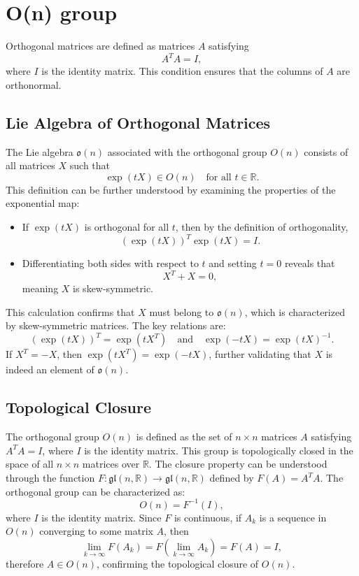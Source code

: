 \documentclass{article}
\begin{document}
\section{O(n) group}

Orthogonal matrices are defined as matrices \( A \) satisfying
\[
A^TA = I,
\]
where \( I \) is the identity matrix. This condition ensures that the columns of \( A \) are orthonormal.

\subsection*{Lie Algebra of Orthogonal Matrices}
The Lie algebra \( \mathfrak{o}(n) \) associated with the orthogonal group \( O(n) \) consists of all matrices \( X \) such that
\[
\exp(tX) \in O(n) \quad \text{for all } t \in \mathbb{R}.
\]
This definition can be further understood by examining the properties of the exponential map:

\begin{itemize}
  \item If \( \exp(tX) \) is orthogonal for all \( t \), then by the definition of orthogonality,
    \[
    (\exp(tX))^T \exp(tX) = I.
    \]
  \item Differentiating both sides with respect to \( t \) and setting \( t = 0 \) reveals that
    \[
    X^T + X = 0,
    \]
    meaning \( X \) is skew-symmetric.
\end{itemize}

This calculation confirms that \( X \) must belong to \( \mathfrak{o}(n) \), which is characterized by skew-symmetric matrices. The key relations are:
\[
(\exp(tX))^T = \exp(tX^T) \quad \text{and} \quad \exp(-tX) = \exp(tX)^{-1}.
\]
If \( X^T = -X \), then \( \exp(tX^T) = \exp(-tX) \), further validating that \( X \) is indeed an element of \( \mathfrak{o}(n) \).

\subsection*{Topological Closure} 

The orthogonal group \(O(n)\) is defined as the set of \(n \times n\) matrices \(A\) satisfying \(A^T A = I\), where \(I\) is the identity matrix. This group is topologically closed in the space of all \(n \times n\) matrices over \(\mathbb{R}\). The closure property can be understood through the function \(F: \mathfrak{gl}(n, \mathbb{R}) \rightarrow \mathfrak{gl}(n, \mathbb{R})\) defined by \(F(A) = A^T A\). The orthogonal group can be characterized as:
\[
O(n) = F^{-1}(I),
\]
where \(I\) is the identity matrix. Since \(F\) is continuous, if \(A_k\) is a sequence in \(O(n)\) converging to some matrix \(A\), then
\[
\lim_{k \to \infty} F(A_k) = F\left(\lim_{k \to \infty} A_k\right) = F(A) = I,
\]
therefore \(A \in O(n)\), confirming the topological closure of \(O(n)\). 
\end{document}
